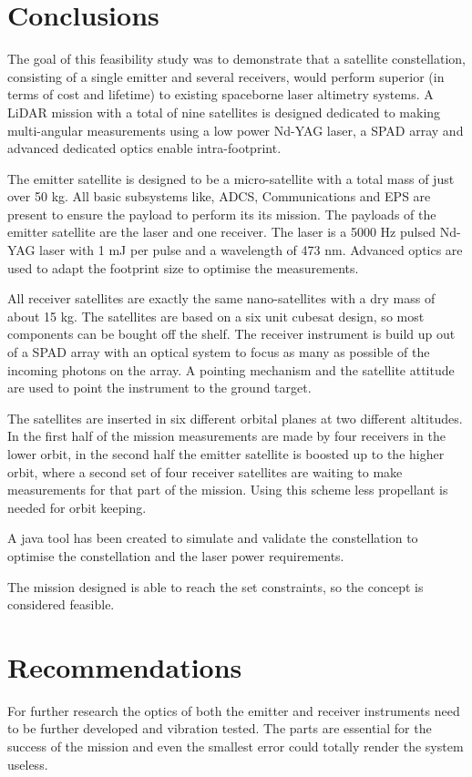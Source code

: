 \section{Conclusions}
\label{frCRconclusions}
The goal of this feasibility study was to demonstrate that a satellite constellation, consisting of a single emitter and several receivers, would perform
superior (in terms of cost and lifetime) to existing spaceborne laser altimetry systems. A \ac{LiDAR} mission with a total of nine satellites is designed dedicated to making multi-angular measurements using a low power \ac{Nd-YAG} \ac{laser}, a \ac{SPAD} array and advanced dedicated optics enable intra-footprint. 

The emitter satellite is designed to be a micro-satellite with a total mass of just over 50 kg. All basic subsystems like, \ac{ADCS}, Communications and \ac{EPS} are present to ensure the payload to perform its its mission. The payloads of the emitter satellite are the \ac{laser} and one receiver. The \ac{laser} is a 5000 Hz pulsed \ac{Nd-YAG} \ac{laser} with 1 mJ per pulse and a wavelength of 473 nm. Advanced optics are used to adapt the footprint size to optimise the measurements.

All receiver satellites are exactly the same nano-satellites with a dry mass of about 15 kg. The satellites are based on a six unit cubesat design, so most components can be bought off the shelf. The receiver instrument is build up out of a \ac{SPAD} array with an optical system to focus as many as possible of the incoming photons on the array. A pointing mechanism and the satellite attitude are used to point the instrument to the ground target.

The satellites are inserted in six different orbital planes at two different altitudes. In the first half of the mission measurements are made by four receivers in the lower orbit, in the second half the emitter satellite is boosted up to the higher orbit, where a second set of four receiver satellites are waiting to make measurements for that part of the mission. Using this scheme less propellant is needed for orbit keeping.

A java tool has been created to simulate and validate the constellation to optimise the constellation and the laser power requirements.

The mission designed is able to reach the set constraints, so the concept is considered feasible.

\section{Recommendations}
\label{frCRrecommendations}
For further research the optics of both the emitter and receiver instruments need to be further developed and vibration tested. The parts are essential for the success of the mission and even the smallest error could totally render the system useless.


